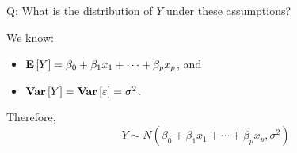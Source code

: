 Q\@: What is the distribution of $ Y $ under these assumptions?

We know:
\begin{itemize}
    \item $ \bm{\mathrm{E}}\left[Y\right]=\beta_0+\beta_1x_1+\cdots+\beta_p x_p $, and
    \item $ \bm{\mathrm{Var}}\left[Y\right]=\bm{\mathrm{Var}}\left[\varepsilon\right]=\sigma^2 $.
\end{itemize}
Therefore,
\[ Y \sim N\left(\beta_0+\beta_1x_1+\cdots+\beta_p x_p,\sigma^2\right) \]
